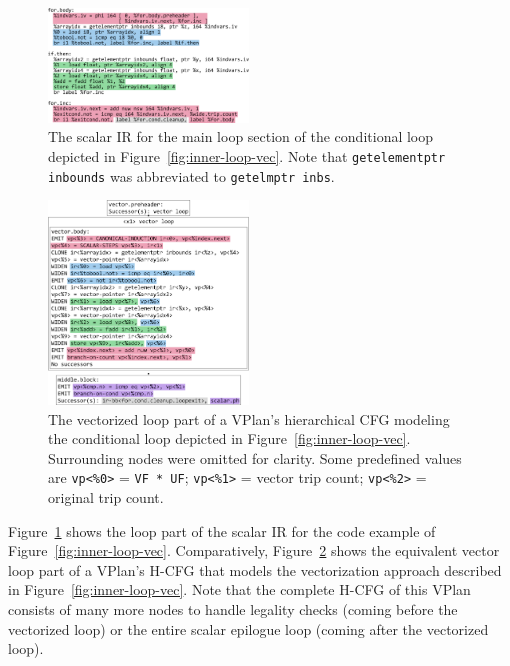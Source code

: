 \documentclass[sigplan,11pt,nonacm]{acmart}
\begin{document}
\begin{figure}
  \centering
  \includegraphics[width=0.475\textwidth]{images/inner-loop-scalar-loop-ir-color.png}
  \caption{The scalar IR for the main loop section of the conditional loop depicted in
  Figure~\ref{fig:inner-loop-vec}. Note that \texttt{getelementptr inbounds}
  was abbreviated to \texttt{getelmptr inbs}.}
  \label{fig:inner-loop-scalar-ir}
\end{figure}

\begin{figure}
  \centering
  \includegraphics[width=0.475\textwidth]{images/inner-loop-vplan-hcfg-loop-body-color.png}
  \caption{The vectorized loop part of a VPlan's hierarchical CFG modeling the 
  conditional loop depicted in Figure~\ref{fig:inner-loop-vec}. 
  Surrounding nodes were omitted for clarity.
  Some predefined values are
  \texttt{vp<\%0>} = \texttt{VF * UF}; \texttt{vp<\%1>} = vector trip count; \texttt{vp<\%2>} = original trip count.}
  \label{fig:inner-loop-vplan-hcfg-body}
\end{figure}

Figure~\ref{fig:inner-loop-scalar-ir} shows the loop part of the scalar IR for the code example
of Figure~\ref{fig:inner-loop-vec}. Comparatively, Figure~\ref{fig:inner-loop-vplan-hcfg-body}
shows the equivalent vector loop part of a VPlan's H-CFG that models the vectorization approach described
in Figure~\ref{fig:inner-loop-vec}. Note that the complete H-CFG of this VPlan consists of many more nodes 
to handle legality checks (coming before the vectorized loop) or the entire scalar epilogue loop 
(coming after the vectorized loop).
\end{document}
